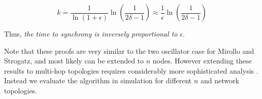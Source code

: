\begin{equation}\label{rateOfSync}
    k = \frac{1}{\ln(1+\epsilon)} \ln(\frac{1}{2\delta-1}) \approx
    \frac{1}{\epsilon} \ln(\frac{1}{2\delta-1})
\end{equation}

Thus, \emph{the time to synchrony is inversely proportional to
$\epsilon$}.

\newpage

Note that these proofs are very similar to the two oscillator case for
Mirollo and Strogatz, and most likely can be extended to $n$
nodes. However extending these results to multi-hop topologies
requires considerably more sophisticated analysis
\cite{lucarelli04}. Instead we evaluate the algorithm in simulation
for different $n$ and network topologies.



